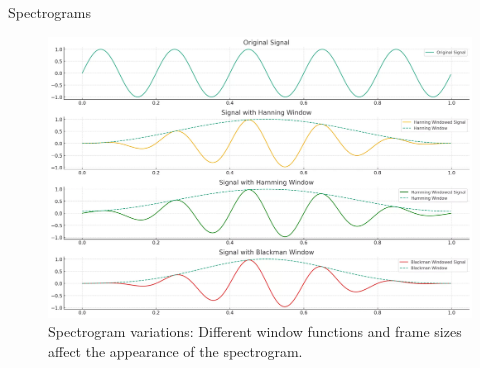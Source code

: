 \begin{frame}[allowframebreaks]{Spectrograms}
\begin{figure}
        \includegraphics[width=\textwidth,height=0.75\textheight,keepaspectratio]{images/audio-nlp/spectrogram-variations.png}
        \caption*{Spectrogram variations: Different window functions and frame sizes affect the appearance of the spectrogram.}
    \end{figure}
\end{frame}